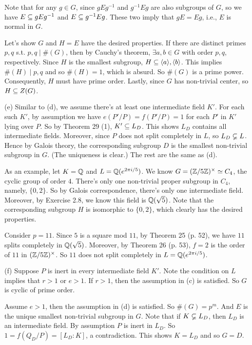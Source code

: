 \documentclass[../Marcus.tex]{subfiles}
\begin{document}
Note that for any $g\in G$, since $gEg^{-1}$ and $g^{-1}Eg$ are also subgroups of $G$, so we have $E \subseteq gEg^{-1}$ and $E \subseteq g^{-1}Eg$. These two imply that $gE=Eg$, i.e., $E$ is normal in $G$.

Let's show $G$ and $H=E$ have the desired properties. If there are distinct primes $p,q$ s.t. $p,q \mid \#(G)$, then by Cauchy's theorem, $\exists a,b\in G$ with order $p,q$, respectively. Since $H$ is the smallest subgroup, $H \subseteq \langle a \rangle,\langle b \rangle$. This implies $\#(H)\mid p,q$ and so $\#(H)=1$, which is absurd. So $\#(G)$ is a prime power. Consequently, $H$ must have prime order. Lastly, since $G$ has non-trivial center, so $H\subseteq Z(G)$.

(e) Similar to (d), we assume there's at least one intermediate field $K'$. For each such $K'$, by assumption we have $e(P'/P)=f(P'/P)=1$ for each $P'$ in $K'$ lying over $P$. So by Theorem 29 (1), $K'\subseteq L_D$. This shows $L_D$ contains all intermediate fields. Moreover, since $P$ does not split completely in $L$, so $L_D\varsubsetneq L$. Hence by Galois theory, the corresponding subgroup $D$ is the smallest non-trivial subgroup in $G$. (The uniqueness is clear.) The rest are the same as (d).

As an example, let $K=\mathbb{Q}$ and $L=\mathbb{Q}(e^{2\pi i/5})$. We know $G=(\mathbb{Z}/5\mathbb{Z})^\times\simeq C_4$, the cyclic group of order $4$. There's only one non-trivial proper subgroup in $C_4$, namely, $\{0,2\}$. So by Galois correspondence, there's only one intermediate field. Moreover, by Exercise 2.8, we know this field is $\mathbb{Q}(\sqrt{5})$. Note that the corresponding subgroup $H$ is isomorphic to $\{0,2\}$, which clearly has the desired properties.

Consider $p=11$. Since $5$ is a square mod $11$, by Theorem 25 (p. 52), we have $11$ splits completely in $\mathbb{Q}(\sqrt{5})$. Moreover, by Theorem 26 (p. 53), $f=2$ is the order of $11$ in $(\mathbb{Z}/5\mathbb{Z})^\times$. So $11$ does not split completely in $L=\mathbb{Q}(e^{2\pi i/5})$.

(f) Suppose $P$ is inert in every intermediate field $K'$. Note the condition on $L$ implies that $r>1$ or $e>1$. If $r>1$, then the assumption in (c) is satisfied. So $G$ is cyclic of prime order.

Assume $e>1$, then the assumption in (d) is satisfied. So $\#(G)=p^m$. And $E$ is the unique smallest non-trivial subgroup in $G$. Note that if $K\varsubsetneq L_D$, then $L_D$ is an intermediate field. By assumption $P$ is inert in $L_D$. So $1 = f(Q_D/P) = [L_D:K]$, a contradiction. This shows $K=L_D$ and so $G=D$.
\end{document}
